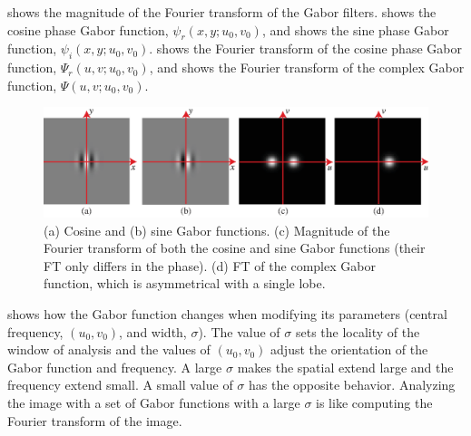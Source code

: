 
\Fig{\ref{fig:gabor_ft}} shows the magnitude of the Fourier transform of the Gabor filters.   shows the cosine phase Gabor function, $\psi_r(x,y;u_0,v_0)$, and  shows the sine phase Gabor function, $\psi_i(x,y;u_0,v_0)$.  shows the Fourier transform of the cosine phase Gabor function, $\Psi_r(u,v;u_0,v_0)$, and  shows the Fourier transform of the complex Gabor function, $\Psi(u,v;u_0,v_0)$.

\begin{figure}
	\centerline{
		\includegraphics[width=1\linewidth]{figures/spatial_filter_sets/gabor_FT.eps} }
	\caption{(a) Cosine and (b) sine Gabor functions. (c) Magnitude of the Fourier transform of both the cosine and sine Gabor functions (their FT only differs in the phase). (d) FT of the complex Gabor function, which is asymmetrical with a single lobe.}
	\label{fig:gabor_ft}
\end{figure}

\Fig{\ref{fig:gabor_ex_ft}} shows how the Gabor function changes when modifying its parameters (central frequency, $(u_0,v_0)$, and width, $\sigma$).
The value of $\sigma$ sets the locality of the window of analysis and the values of $(u_0,v_0)$ adjust the orientation of the Gabor function and frequency.  A large $\sigma$ makes the spatial extend large and the frequency extend small.  A small value of $\sigma$ has the opposite behavior.
Analyzing the image with a set of Gabor functions with a large $\sigma$ is like computing the Fourier transform of the image.


